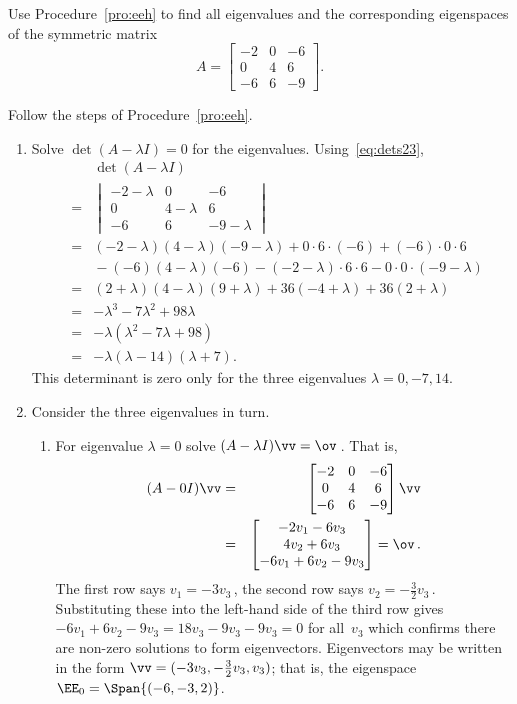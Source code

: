 \begin{example} \label{eg:3x3hande}
Use Procedure~\ref{pro:eeh} to find all eigenvalues and the corresponding eigenspaces of the symmetric matrix
\begin{equation*}
A=\begin{bmatrix} -2&0&-6\\0&4&6\\-6&6&-9 \end{bmatrix}.
\end{equation*}

\begin{solution} 
Follow the steps of Procedure~\ref{pro:eeh}.
\begin{enumerate}
\item Solve \(\det(A-\lambda I)=0\) for the eigenvalues.
Using~\eqref{eq:dets23},
\begin{eqnarray*}&&
\det(A-\lambda I)
\\&=& \begin{vmatrix} -2-\lambda&0&-6\\0&4-\lambda&6\\-6&6&-9-\lambda \end{vmatrix}
\\&=&(-2-\lambda)(4-\lambda)(-9-\lambda)+0\cdot6\cdot(-6)+(-6)\cdot0\cdot 6
\\&&{}
-(-6)(4-\lambda)(-6)-(-2-\lambda)\cdot6\cdot6-0\cdot0\cdot(-9-\lambda)
\\&=&(2+\lambda)(4-\lambda)(9+\lambda)+36(-4+\lambda)+36(2+\lambda)
\\&=&-\lambda^3-7\lambda^2+98\lambda
\\&=&-\lambda(\lambda^2-7\lambda+98)
\\&=&-\lambda(\lambda-14)(\lambda+7).
\end{eqnarray*}
This determinant is zero only for the three eigenvalues \(\lambda=0,-7,14\).

\item Consider the three eigenvalues in turn.
\begin{enumerate}
\item For eigenvalue \(\lambda=0\) solve \((A-\lambda I)\vv=\ov\)\,.  
That is,
\begin{eqnarray*}
(A-0I)\vv&=&\begin{bmatrix} -2&0&-6\\0&4&6\\-6&6&-9 \end{bmatrix}\vv
\\&=&\begin{bmatrix} -2v_1-6v_3\\4v_2+6v_3\\-6v_1+6v_2-9v_3 \end{bmatrix}=\ov\,.
\end{eqnarray*}
The first row says \(v_1=-3v_3\)\,, the second row says \(v_2=-\frac32v_3\)\,.  
Substituting these into the left-hand side of the third row gives
\(-6v_1+6v_2-9v_3=18v_3-9v_3-9v_3=0\) for all~\(v_3\) which confirms there are non-zero solutions to form eigenvectors.
Eigenvectors may be written in the form \(\vv=(-3v_3,-\frac32v_3,v_3)\); that is, the eigenspace \(\EE_0=\Span\{(-6,-3,2)\}\).


\end{enumerate}
\end{enumerate}
\end{solution}
\end{example}
